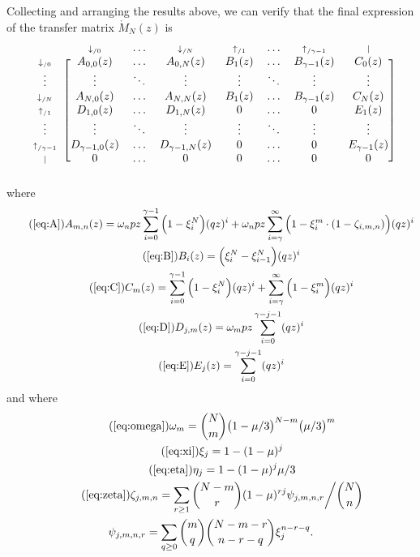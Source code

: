 \documentclass{article}
\newcommand{\dn}[1]{\scriptstyle{\downarrow_{/#1}}}
\newcommand{\up}[1]{\scriptstyle{\uparrow_{/#1}}}
\newcommand{\nd}{\scriptstyle{|}}
\begin{document}
Collecting and arranging the results above, we can verify that the final
expression of the transfer matrix $\mathring{M}_N(z)$ is
\begin{equation*}
\begin{blockarray}{cccccccc}
   & \dn{0} & \ldots & \dn{N} & \up{1} & \ldots & \up{\gamma-1} & \nd \\
\begin{block}{c[ccccccc]}
\dn{0} & A_{0,0}(z) & \ldots & A_{0,N}(z) & B_1(z) & \ldots &
    B_{\gamma-1}(z) & C_0(z) \\
\vdots & \vdots & \ddots & \vdots & \vdots & \ddots &
    \vdots & \vdots \\
\dn{N} & A_{N,0}(z) & \ldots & A_{N,N}(z) & B_1(z) & \ldots &
    B_{\gamma-1}(z) & C_N(z) \\
\up{1} & D_{1,0}(z) & \ldots & D_{1,N}(z) & 0 & \ldots & 0 & E_1(z) \\
\vdots & \vdots & \ddots & \vdots & \vdots & \ddots &
    \vdots & \vdots \\
\up{\gamma-1} & D_{\gamma-1,0}(z) & \ldots & D_{\gamma-1,N}(z) & 0 &
  \ldots & 0 & E_{\gamma-1}(z) \\
\nd & 0 & \ldots & 0 & 0 & \ldots & 0 & 0 \\
\end{block}
\end{blockarray}
\end{equation*}
where
\begin{gather}
\tag{\ref{eq:A}}
A_{m,n}(z) =
\omega_n pz \sum_{i=0}^{\gamma-1} \Big(1 - \xi_i^N \Big) (qz)^i + \omega_n
pz \sum_{i=\gamma}^\infty \Big(1 - \xi_i^m \cdot
(1- \zeta_{i,m,n}) \Big) (qz)^i \\
\tag{\ref{eq:B}}
B_i(z) = \Big( \xi_i^N-\xi_{i-1}^N \Big) (qz)^i \\
\tag{\ref{eq:C}}
C_m(z) =
\sum_{i=0}^{\gamma-1} \Big(1 - \xi_i^N \Big) (qz)^i +
  \sum_{i=\gamma}^\infty \Big(1 - \xi_i^m \Big) (qz)^i \\
\tag{\ref{eq:D}}
D_{j,m}(z) = \omega_m pz \sum_{i=0}^{\gamma-j-1} (qz)^i \\
\tag{\ref{eq:E}}
E_j(z) = \sum_{i=0}^{\gamma-j-1} (qz)^i
\end{gather}
and where
\begin{gather}
\tag{\ref{eq:omega}}
\omega_m = {N \choose m} \big(1 - \mu/3\big)^{N-m} \big(\mu/3\big)^m \\
\tag{\ref{eq:xi}}
\xi_j = 1-(1-\mu)^j \\
\tag{\ref{eq:eta}}
\eta_j = 1-(1-\mu)^j\mu/3 \\
\tag{\ref{eq:zeta}}
\zeta_{j,m,n} = \sum_{r\geq1} {N-m \choose r}
(1-\mu)^{rj} \psi_{j,m,n,r} \bigg/ {N \choose n} \\
\notag
\psi_{j,m,n,r} = \sum_{q \geq 0}{m \choose q}{N-m-r \choose n-r-q}
\xi_j^{n-r-q}.
\end{gather}
\end{document}
